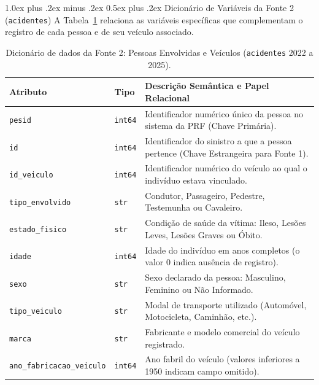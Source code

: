 \documentclass[11pt,a4paper]{article}
\makeatletter
\renewcommand\subsubsection{
\@startsection{subsubsection}{3}{0pt}%
{1.0ex plus .2ex minus .2ex}%
{0.5ex plus .2ex}%
{\normalfont\normalsize\bfseries}
}
\makeatother
\begin{document}
\subsubsection{Dicionário de Variáveis da Fonte 2 (\texttt{acidentes})}
A Tabela~\ref{tab:dicionario_f2} relaciona as variáveis específicas que complementam o registro de cada pessoa e de seu veículo associado.

\begin{table}[H]
\centering
\scriptsize
\renewcommand{\arraystretch}{1.15}
\caption{Dicionário de dados da Fonte 2: Pessoas Envolvidas e Veículos (\texttt{acidentes} 2022 a 2025).}
\label{tab:dicionario_f2}
\begin{tabularx}{\textwidth}{|p{3.4cm}|p{1.4cm}|X|}
\hline
\textbf{Atributo} & \textbf{Tipo} & \textbf{Descrição Semântica e Papel Relacional} \\
\hline
\texttt{pesid} & \texttt{int64} & Identificador numérico único da pessoa no sistema da PRF (Chave Primária). \\
\hline
\texttt{id} & \texttt{int64} & Identificador do sinistro a que a pessoa pertence (Chave Estrangeira para Fonte 1). \\
\hline
\texttt{id\_veiculo} & \texttt{int64} & Identificador numérico do veículo ao qual o indivíduo estava vinculado. \\
\hline
\texttt{tipo\_envolvido} & \texttt{str} & Condutor, Passageiro, Pedestre, Testemunha ou Cavaleiro. \\
\hline
\texttt{estado\_fisico} & \texttt{str} & Condição de saúde da vítima: Ileso, Lesões Leves, Lesões Graves ou Óbito. \\
\hline
\texttt{idade} & \texttt{int64} & Idade do indivíduo em anos completos (o valor 0 indica ausência de registro). \\
\hline
\texttt{sexo} & \texttt{str} & Sexo declarado da pessoa: Masculino, Feminino ou Não Informado. \\
\hline
\texttt{tipo\_veiculo} & \texttt{str} & Modal de transporte utilizado (Automóvel, Motocicleta, Caminhão, etc.). \\
\hline
\texttt{marca} & \texttt{str} & Fabricante e modelo comercial do veículo registrado. \\
\hline
\texttt{ano\_fabricacao\_veiculo} & \texttt{int64} & Ano fabril do veículo (valores inferiores a 1950 indicam campo omitido). \\
\hline
\end{tabularx}
\end{table}
\end{document}
